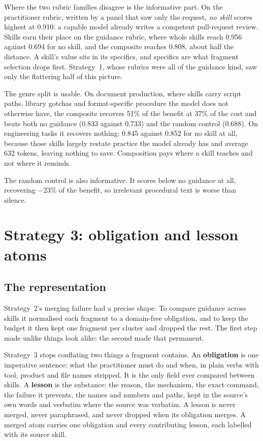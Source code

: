 \documentclass[11pt]{article}
\begin{document}
Where the two rubric families disagree is the informative part. On the practitioner rubric, written
by a panel that saw only the request, \emph{no skill} scores highest at 0.910: a capable model
already writes a competent pull-request review. Skills earn their place on the guidance rubric,
where whole skills reach 0.956 against 0.694 for no skill, and the composite reaches 0.808, about
half the distance. A skill's value sits in its specifics, and specifics are what fragment selection
drops first. Strategy~1, whose rubrics were all of the guidance kind, saw only the flattering half
of this picture.

The genre split is usable. On document production, where skills carry script paths, library
gotchas and format-specific procedure the model does not otherwise have, the composite recovers 51\%
of the benefit at 37\% of the cost and beats both no guidance (0.833 against 0.733) and the random
control (0.688). On engineering tasks it recovers nothing: 0.845 against 0.852 for no skill at all,
because those skills largely restate practice the model already has and average 632 tokens, leaving
nothing to save. Composition pays where a skill teaches and not where it reminds.

The random control is also informative. It scores below no guidance at all, recovering $-23\%$ of
the benefit, so irrelevant procedural text is worse than silence.

\section{Strategy 3: obligation and lesson atoms}
\label{sec:s3}

\subsection{The representation}

Strategy~2's merging failure had a precise shape. To compare guidance across skills it normalised
each fragment to a domain-free obligation, and to keep the budget it then kept one fragment per
cluster and dropped the rest. The first step made unlike things look alike; the second made that
permanent.

Strategy~3 stops conflating two things a fragment contains. An \textbf{obligation} is one imperative
sentence: what the practitioner must do and when, in plain verbs with tool, product and file names
stripped. It is the only field ever compared between skills. A \textbf{lesson} is the substance: the
reason, the mechanism, the exact command, the failure it prevents, the names and numbers and paths,
kept in the source's own words and verbatim where the source was verbatim. A lesson is never merged,
never paraphrased, and never dropped when its obligation merges. A merged atom carries one obligation
and every contributing lesson, each labelled with its source skill.
\end{document}
